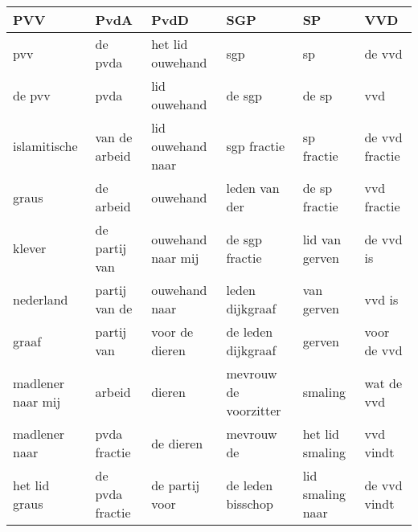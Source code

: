 \begin{tabular}{llllll}
\toprule
               PVV &             PvdA &               PvdD &                    SGP &                SP &             VVD \\
\midrule
               pvv &          de pvda &   het lid ouwehand &                    sgp &                sp &          de vvd \\
            de pvv &             pvda &       lid ouwehand &                 de sgp &             de sp &             vvd \\
      islamitische &    van de arbeid &  lid ouwehand naar &            sgp fractie &        sp fractie &  de vvd fractie \\
             graus &        de arbeid &           ouwehand &          leden van der &     de sp fractie &     vvd fractie \\
            klever &    de partij van &  ouwehand naar mij &         de sgp fractie &    lid van gerven &       de vvd is \\
         nederland &    partij van de &      ouwehand naar &        leden dijkgraaf &        van gerven &          vvd is \\
             graaf &       partij van &     voor de dieren &     de leden dijkgraaf &            gerven &     voor de vvd \\
 madlener naar mij &           arbeid &             dieren &  mevrouw de voorzitter &           smaling &      wat de vvd \\
     madlener naar &     pvda fractie &          de dieren &             mevrouw de &   het lid smaling &       vvd vindt \\
     het lid graus &  de pvda fractie &     de partij voor &      de leden bisschop &  lid smaling naar &    de vvd vindt \\
\bottomrule
\end{tabular}
